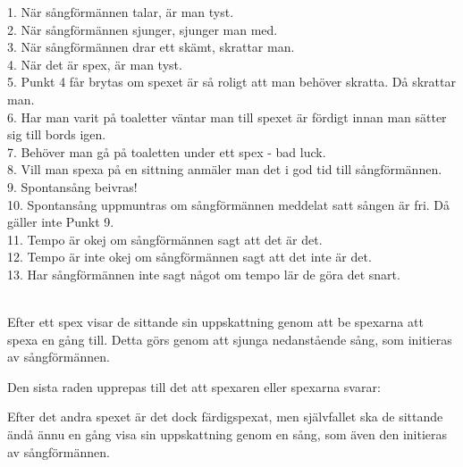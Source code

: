 1. När sångförmännen talar, är man tyst.\\
2. När sångförmännen sjunger, sjunger man med.\\
3. När sångförmännen drar ett skämt, skrattar man.\\
4. När det är spex, är man tyst.\\
5. Punkt 4 får brytas om spexet är så roligt att man behöver skratta. Då skrattar man.\\
6. Har man varit på toaletter väntar man till spexet är fördigt innan man sätter sig till bords igen.\\
7. Behöver man gå på toaletten under ett spex - bad luck.\\
8. Vill man spexa på en sittning anmäler man det i god tid till sångförmännen.\\
9. Spontansång beivras!\\
10. Spontansång uppmuntras om sångförmännen meddelat satt sången är fri. Då gäller inte Punkt 9.\\
11. Tempo är okej om sångförmännen sagt att det är det.\\
12. Tempo är inte okej om sångförmännen sagt att det inte är det.\\
13. Har sångförmännen inte sagt något om tempo lär de göra det snart.\\
\\


\newpage

Efter ett spex visar de sittande sin uppskattning genom att be spexarna att spexa en gång till.
Detta görs genom att sjunga nedanstående sång, som initieras av sångförmännen.
\\


Den sista raden upprepas till det att spexaren eller spexarna svarar:
\\


Efter det andra spexet är det dock färdigspexat, men självfallet ska de sittande 
ändå ännu en gång visa sin uppskattning genom en sång, som även den initieras av sångförmännen.
\\

